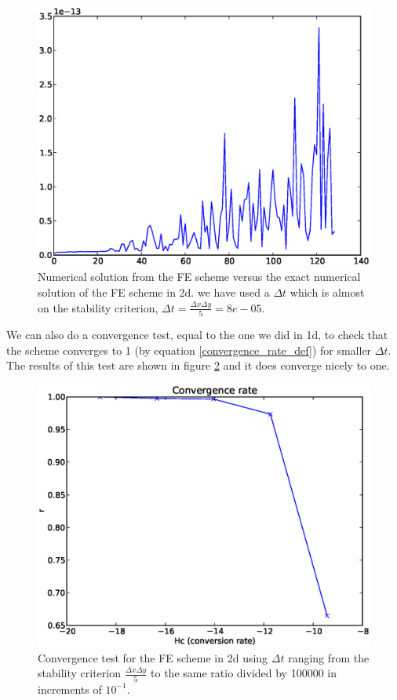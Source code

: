 \begin{figure}[H]
 \centering
 \includegraphics[scale=0.7]{Figures/exact_numerical_2d_n130.eps}
 \caption{Numerical solution from the FE scheme versus the exact numerical solution of the FE scheme in 2d. we have used a $\Delta t$ which is almost on the stability criterion, $\Delta t = \frac{\Delta x \Delta y}{5} = 8e-05$.}
 \label{exact_numerical_2d_n130}
\end{figure}

We can also do a convergence test, equal to the one we did in 1d, to check that the scheme converges to 1 (by equation \ref{convergence_rate_def}) for smaller $\Delta t$. 
The results of this test are shown in figure \ref{convergence_test_FE_2d} and it does converge nicely to one.

\begin{figure}[H]
\centering
\includegraphics[scale=0.7]{../doc/results/experiment_29112013_1709/results/ConvergenceTest.eps}
\caption[Convergence test FE 2d]{Convergence test for the FE scheme in 2d using $\Delta t$ ranging from the stability criterion $\frac{\Delta x\Delta y}{5}$ to the same ratio divided by 100000 in increments of $10^{-1}$.}
\label{convergence_test_FE_2d}
\end{figure}


